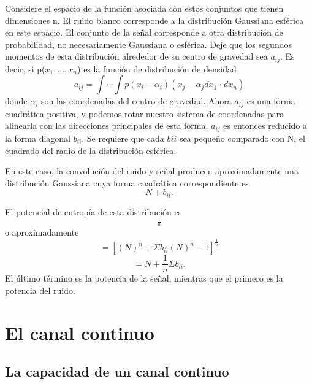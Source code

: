 	Considere el espacio de la funci\'on asociada con estos
	conjuntos que tienen dimensiones n. El ruido blanco
	corresponde a la distribuci\'on Gaussiana esf\'erica en este
	espacio. El conjunto de la se\~nal corresponde a otra
	distribuci\'on de probabilidad, no necesariamente Gaussiana o
	esf\'erica. Deje que los segundos momentos de esta
	distribuci\'on alrededor de su centro de gravedad sea
	$a_{ij}$.  Es decir, si p($x_{1},...,x_{n}$) es la funci\'on
	de distribuci\'on de densidad \begin{equation}
	a_{ij}=\int \cdots \int
	p(x_{i}-\alpha_{i})(x_{j}-\alpha_{j}dx_{1} \cdots
	dx_{n}) \end{equation} donde $\alpha_{i}$ son las coordenadas
	del centro de gravedad. Ahora $a_{ij}$ es una forma
	cuadr\'atica positiva, y podemos rotar nuestro sistema de
	coordenadas para alinearla con las direcciones principales de
	esta forma. $a_{ij}$ es entonces reducido a la forma diagonal
	$b_{ii}$. Se requiere que cada $b{ii}$ sea peque\~no comparado
	con N, el cuadrado del radio de la distribuci\'on esf\'erica.
	
	En este caso, la convoluci\'on del ruido y se\~nal producen
	aproximadamente una distribuci\'on Gaussiana cuya forma
	cuadr\'atica correspondiente es \begin{equation} N +
	b_{ii}.  \end{equation}
	
	El potencial de entrop\'ia de esta distribuci\'on
	es \begin{equation} [\Pi(N +
	b_{ii})]^\frac{1}{n} \end{equation} o
	aproximadamente \begin{equation} = [(N)^n + \Sigma
	b_{ii}(N)^n-1]^\frac{1}{n} \end{equation} \begin{equation} = N
	+ \frac{1}{n}\Sigma b_{ii}.  \end{equation} El \'ultimo
	t\'ermino es la potencia de la se\~nal, mientras que el
	primero es la potencia del ruido.
	
\clearpage
	
        	\chapter{El canal continuo}
	

\section{La capacidad de un canal continuo}	
	

